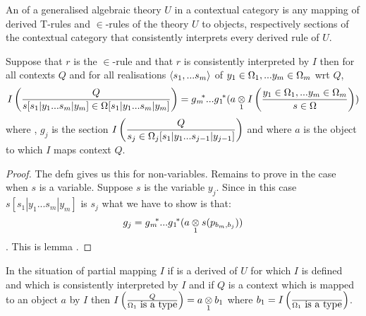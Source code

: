 \begin{definition}
An  of a generalised algebraic theory $U$ in a contextual category \catcw is  any mapping 
of derived T-rules and $\in$-rules of the theory $U$ to objects, respectively sections of the contextual category \catcw that
consistently interprets every derived rule of $U$.
\end{definition}

\begin{lemma}
Suppose that $r$ is the $\in$-rule \srule and that
$r$ is consistently interpreted by $I$ 
then
for all contexts $Q$ and for all realisations $\tuple{\sm}$ of $\yOmega{m}$ wrt $Q$, 
$$ \Imappedrule{Q}{\ofT{s[s_1|y_1...s_m|y_m]}{\Omega[s_1|y_1...s_m|y_m]}} = \gmstar...\gonestar(\crossx{a}{\Imappedrule{\yOmega{m}}{\ofT{s}{\Omega}}}{1})$$
where \foreachj, $g_j$ is the section
$\displaystyle\Imappedrule{Q}{ \ofT{s_j}{\Omega_j [s_1|y_1...s_{j-1}|y_{j-1}]}}$
and where $a$ is the object to which $I$ maps context $Q$.
\end{lemma}
\begin{proof}
The defn gives us this for non-variables. Remains to prove in the case when $s$ is a variable. Suppose $s$ is the variable
$y_j$. Since in this case $s[s_1|y_1...s_m|y_m]$ is $s_j$ what we have to show is that:
$$g_j = \gmvectorstar(\crossx{a}{s(p_{b_m,b_j}}{1}))$$. This is lemma .
\end{proof}

\begin{observation}
In the situation of  partial mapping $I$ 
if \omegarule is a derived of $U$ for which $I$ is defined and which is consistently interpreted by $I$ and if $Q$ is a context which is mapped to an object $a$ by $I$ 
then $\Imappedrule{Q}{\isT{\Omega_1}}=\crossx{a}{b_1}{1}$ where $b_1=\Imappedrule{}{\isT{\Omega_1}}$.
\end{observation}



